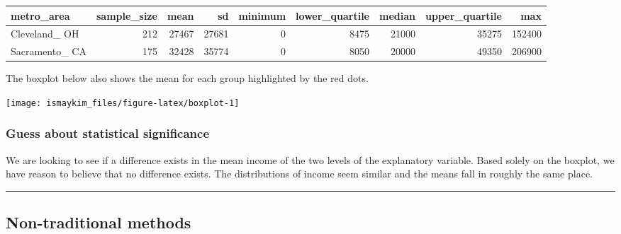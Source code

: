 \documentclass[]{tufte-book}
\newenvironment{Shaded}{\begin{snugshade}}{\end{snugshade}}
\newcommand{\KeywordTok}[1]{\textcolor[rgb]{0.13,0.29,0.53}{\textbf{{#1}}}}
\newcommand{\DataTypeTok}[1]{\textcolor[rgb]{0.13,0.29,0.53}{{#1}}}
\newcommand{\StringTok}[1]{\textcolor[rgb]{0.31,0.60,0.02}{{#1}}}
\newcommand{\NormalTok}[1]{{#1}}
\let\oldrule=\rule
\renewcommand{\rule}[1]{\oldrule{\linewidth}}
\begin{document}
\begin{tabular}{l|r|r|r|r|r|r|r|r}
\hline
metro\_area & sample\_size & mean & sd & minimum & lower\_quartile & median & upper\_quartile & max\\
\hline
Cleveland\_ OH & 212 & 27467 & 27681 & 0 & 8475 & 21000 & 35275 & 152400\\
\hline
Sacramento\_ CA & 175 & 32428 & 35774 & 0 & 8050 & 20000 & 49350 & 206900\\
\hline
\end{tabular}

The boxplot below also shows the mean for each group highlighted by the
red dots.

\begin{Shaded}
\end{Shaded}

\begin{center}\texttt{[image: ismaykim\_files/figure-latex/boxplot-1]} \end{center}

\subsubsection{Guess about statistical
significance}\label{guess-about-statistical-significance-3}

We are looking to see if a difference exists in the mean income of the
two levels of the explanatory variable. Based solely on the boxplot, we
have reason to believe that no difference exists. The distributions of
income seem similar and the means fall in roughly the same place.

\begin{center}\rule{0.5\linewidth}{\linethickness}\end{center}

\subsection{Non-traditional methods}\label{non-traditional-methods-3}
\end{document}
